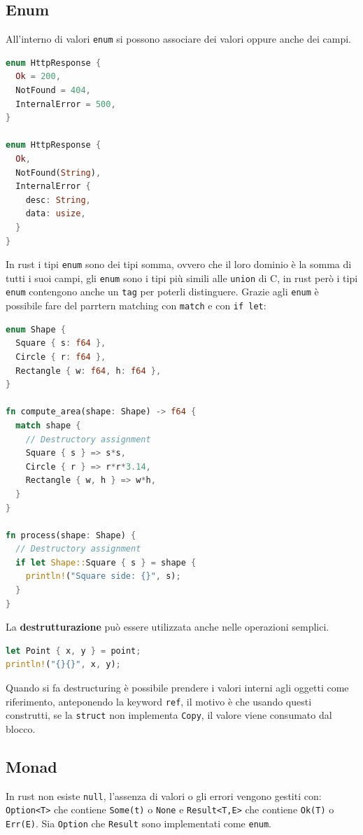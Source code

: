 \documentclass[12pt]{article}
\begin{document}
\subsection{Enum}
All'interno di valori \texttt{enum} si possono associare dei valori oppure anche dei campi.
\begin{lstlisting}[language=rust]
enum HttpResponse {
  Ok = 200,
  NotFound = 404,
  InternalError = 500,
}

enum HttpResponse {
  Ok,
  NotFound(String),
  InternalError {
    desc: String,
    data: usize,
  }
}
\end{lstlisting}
In rust i tipi \texttt{enum} sono dei tipi somma, ovvero che il loro dominio \`e la somma di tutti i suoi campi, gli \texttt{enum} sono i tipi pi\`u simili alle \texttt{union} di C, in rust per\`o i tipi \texttt{enum} contengono anche un \texttt{tag} per poterli distinguere. Grazie agli \texttt{enum} \`e possibile fare del parrtern matching con \texttt{match} e con \texttt{if let}:
\begin{lstlisting}[language=rust]
enum Shape {
  Square { s: f64 },
  Circle { r: f64 },
  Rectangle { w: f64, h: f64 },
}

fn compute_area(shape: Shape) -> f64 {
  match shape {
    // Destructory assignment
    Square { s } => s*s,
    Circle { r } => r*r*3.14,
    Rectangle { w, h } => w*h,
  }
}

fn process(shape: Shape) {
  // Destructory assignment
  if let Shape::Square { s } = shape {
    println!("Square side: {}", s);
  }
}
\end{lstlisting}
La \textbf{destrutturazione} pu\`o essere utilizzata anche nelle operazioni semplici.
\begin{lstlisting}[language=rust]
let Point { x, y } = point;
println!("{}{}", x, y);
\end{lstlisting}
Quando si fa destructuring \`e possibile prendere i valori interni agli oggetti come riferimento, anteponendo la keyword \texttt{ref}, il motivo \`e che usando questi construtti, se la \texttt{struct} non implementa \texttt{Copy}, il valore viene consumato dal blocco.

\subsection{Monad}
In rust non esiste \texttt{null}, l'assenza di valori o gli errori vengono gestiti con: \texttt{Option<T>} che contiene \texttt{Some(t)} o \texttt{None} e \texttt{Result<T,E>} che contiene \texttt{Ok(T)} o \texttt{Err(E)}. Sia \texttt{Option} che \texttt{Result} sono implementati come \texttt{enum}.
\end{document}
